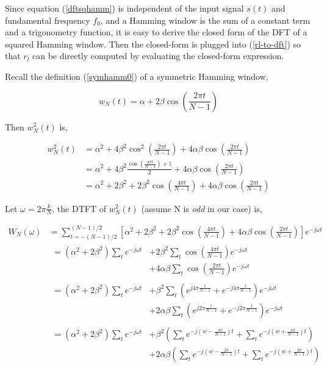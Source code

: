 \documentclass[dvips]{article}
\begin{document}
Since equation (\ref{dftsqhamm}) is independent of the input signal $s(t)$ and fundamental frequency $f_0$, and a Hamming window is the sum of a constant term and a trigonometry function, it is easy to derive the closed form of the DFT of a squared Hamming window. Then the closed-form is plugged into (\ref{rl-to-dft}) so that $r_l$ can be directly computed by evaluating the closed-form expression.

Recall the definition (\ref{symhamm0}) of a symmetric Hamming window,

\begin{equation} \label{symhammN}
w_N(t) = \alpha + 2\beta\cos(\frac{2\pi t}{N - 1})
\end{equation}

Then $w_N^2(t)$ is,

\begin{align} \label{hammsq}
w_N^2(t) &= \alpha^2 + 4\beta^2\cos^2(\frac{2\pi t}{N - 1}) + 4\alpha\beta\cos(\frac{2\pi t}{N - 1}) \\
		 &= \alpha^2 + 4\beta^2\frac{\cos(\frac{4\pi t}{N - 1}) + 1}{2} + 4\alpha\beta\cos(\frac{2\pi t}{N - 1}) \\
		 &= \alpha^2 + 2\beta^2 + 2\beta^2\cos(\frac{4\pi t}{N - 1}) + 4\alpha\beta\cos(\frac{2\pi t}{N - 1})
\end{align}

Let $\omega = 2\pi\frac{k}{N}$, the DTFT of $w_N^2(t)$ (assume N is \emph{odd} in our case) is,

\newcommand{\nrng}{(N - 1) / 2}
\begin{align}
W_N(\omega) &= \sum_{t = -\nrng}^{\nrng} [\alpha^2 + 2\beta^2 + 2\beta^2\cos(\frac{4\pi t}{N - 1}) + 4\alpha\beta\cos(\frac{2\pi t}{N - 1})] e^{-j\omega t} \\
			&\phantom{}
			\begin{aligned}
			= (\alpha^2 + 2\beta^2) \sum_{t} e^{-j\omega t} &+ 2\beta^2 \sum_{t} \cos(\frac{4\pi t}{N - 1}) e^{-j\omega t} \\
			&+ 4\alpha\beta \sum_{t} \cos(\frac{2\pi t}{N - 1}) e^{-j\omega t}
			\end{aligned} \\
			&\phantom{}
			\begin{aligned}
			= (\alpha^2 + 2\beta^2) \sum_{t} e^{-j\omega t} &+ \beta^2 \sum_{t} \left(e^{j4\pi\frac{t}{N - 1}} + e^{-j4\pi\frac{t}{N - 1}} \right) e^{-j\omega t} \\
			&+ 2\alpha\beta \sum_{t} \left(e^{j2\pi\frac{t}{N - 1}} + e^{-j2\pi\frac{t}{N - 1}} \right) e^{-j\omega t}
			\end{aligned} \\
			&\phantom{}
			\begin{aligned} \label{dtfthammsq}
			= (\alpha^2 + 2\beta^2) \sum_{t} e^{-j\omega t}
				&+ \beta^2 \left(\sum_{t} e^{-j(w - \frac{4\pi}{N - 1}) t}
					+ \sum_{t} e^{-j(w + \frac{4\pi}{N - 1}) t} \right) \\
			&+ 2\alpha\beta \left(\sum_{t} e^{-j(w - \frac{2\pi}{N - 1}) t}
					+ \sum_{t} e^{-j(w + \frac{2\pi}{N - 1}) t} \right)
			\end{aligned}
\end{align}
\end{document}
